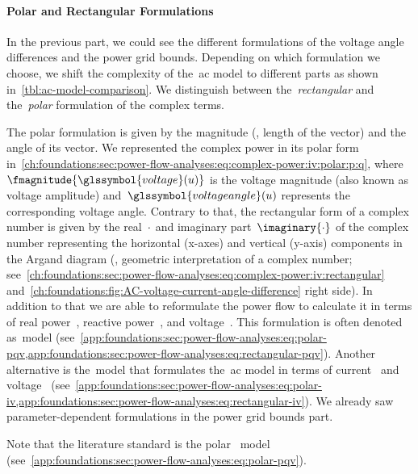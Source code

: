 \paragraph{Polar and Rectangular Formulations}
\label{ch:foundations:polar-rectangular-formulation}
% 
In the previous part, we could see the different formulations of the voltage
angle differences and the power grid bounds. Depending on which formulation we
choose, we shift the complexity of the~\gls{ac} model to different parts as
shown in~\cref{tbl:ac-model-comparison}. We distinguish between
the~\emph{rectangular} and the~\emph{polar} formulation of the complex terms.

The polar formulation is given by the magnitude (\ie, length of the vector) and
the angle of its vector. We represented the complex power in its polar form
in~\cref{ch:foundations:sec:power-flow-analyses:eq:complex-power:iv:polar:p:q},
where~$\fmagnitude{\glssymbol{voltage}(\vertexa)}$ is the voltage magnitude
(also known as voltage amplitude) and~$\glssymbol{voltageangle}(\vertexa)$
represents the corresponding voltage angle.
% 
Contrary to that, the rectangular form of a complex number is given by the
real~$\real{\cdot}$ and imaginary part~$\imaginary{\cdot}$ of the complex number
representing the horizontal (x-axes) and vertical (y-axis) components in the
Argand diagram (\ie, geometric interpretation of a complex number;
see~\cref{ch:foundations:sec:power-flow-analyses:eq:complex-power:iv:rectangular}
and~\cref{ch:foundations:fig:AC-voltage-current-angle-difference} right side).
% 
In addition to that we are able to reformulate the power flow to calculate it in
terms of real power~, reactive
power~, and voltage~. This
formulation is often denoted as~\pqv model
(see~\cref{app:foundations:sec:power-flow-analyses:eq:polar-pqv,app:foundations:sec:power-flow-analyses:eq:rectangular-pqv}).
Another alternative is the~\iv model that formulates the~\gls{ac} model in terms
of current~ and voltage~
(see~\cref{app:foundations:sec:power-flow-analyses:eq:polar-iv,app:foundations:sec:power-flow-analyses:eq:rectangular-iv}).
We already saw parameter-dependent formulations in the power grid bounds part.

Note that the literature standard is the polar~\pqv
model~\parencite{wood1996power,Zimmerman2011} (see~\cref{app:foundations:sec:power-flow-analyses:eq:polar-pqv}).
% 
